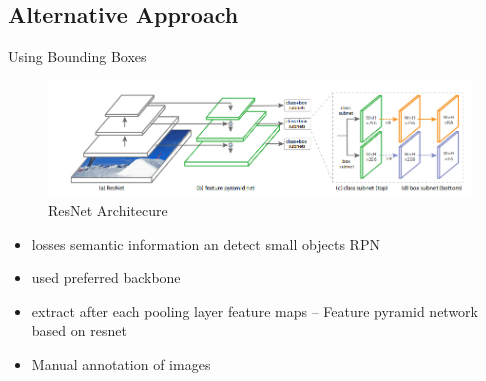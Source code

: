 \documentclass[10pt]{beamer}
\begin{document}
\subsection{Alternative Approach}
\begin{frame}{Using Bounding Boxes}
	\begin{figure}
		\includegraphics[width=\columnwidth]{images/retinanet.png}
		\caption{ResNet Architecure}
	\end{figure}

	\begin{itemize}
		\item losses semantic information an detect small objects RPN
		\item used preferred backbone
		\item extract after each pooling layer feature maps -- Feature pyramid network based on resnet
		\item Manual annotation of images
	\end{itemize}
\end{frame}

\end{document}
